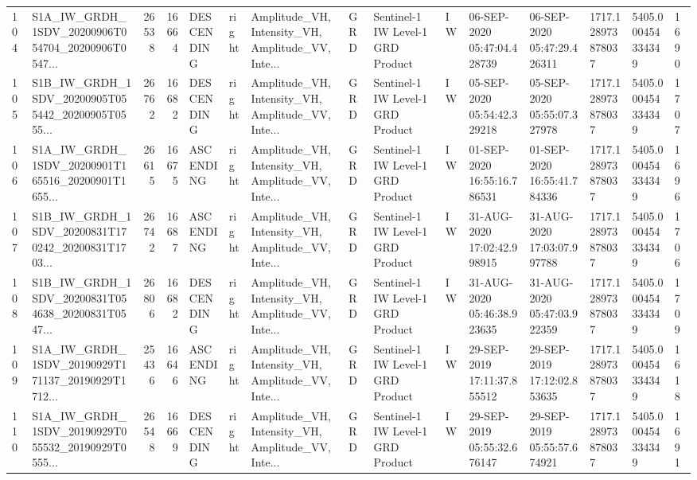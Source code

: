 \begin{tabular}{llrrlllllllllll}
104 &  S1A\_IW\_GRDH\_1SDV\_20200906T054704\_20200906T0547... &  26538 &   16664 &  DESCENDING &  right &  Amplitude\_VH, Intensity\_VH, Amplitude\_VV, Inte... &          GRD &  Sentinel-1 IW Level-1 GRD Product &              IW &  06-SEP-2020 05:47:04.428739 &  06-SEP-2020 05:47:29.426311 &          1717.128973878037 &  5405.000454334349 &       1690 \\
105 &  S1B\_IW\_GRDH\_1SDV\_20200905T055442\_20200905T0555... &  26762 &   16682 &  DESCENDING &  right &  Amplitude\_VH, Intensity\_VH, Amplitude\_VV, Inte... &          GRD &  Sentinel-1 IW Level-1 GRD Product &              IW &  05-SEP-2020 05:54:42.329218 &  05-SEP-2020 05:55:07.327978 &          1717.128973878037 &  5405.000454334349 &       1707 \\
106 &  S1A\_IW\_GRDH\_1SDV\_20200901T165516\_20200901T1655... &  26615 &   16675 &   ASCENDING &  right &  Amplitude\_VH, Intensity\_VH, Amplitude\_VV, Inte... &          GRD &  Sentinel-1 IW Level-1 GRD Product &              IW &  01-SEP-2020 16:55:16.786531 &  01-SEP-2020 16:55:41.784336 &          1717.128973878037 &  5405.000454334349 &       1696 \\
107 &  S1B\_IW\_GRDH\_1SDV\_20200831T170242\_20200831T1703... &  26742 &   16687 &   ASCENDING &  right &  Amplitude\_VH, Intensity\_VH, Amplitude\_VV, Inte... &          GRD &  Sentinel-1 IW Level-1 GRD Product &              IW &  31-AUG-2020 17:02:42.998915 &  31-AUG-2020 17:03:07.997788 &          1717.128973878037 &  5405.000454334349 &       1706 \\
108 &  S1B\_IW\_GRDH\_1SDV\_20200831T054638\_20200831T0547... &  26806 &   16682 &  DESCENDING &  right &  Amplitude\_VH, Intensity\_VH, Amplitude\_VV, Inte... &          GRD &  Sentinel-1 IW Level-1 GRD Product &              IW &  31-AUG-2020 05:46:38.923635 &  31-AUG-2020 05:47:03.922359 &          1717.128973878037 &  5405.000454334349 &       1709 \\
109 &  S1A\_IW\_GRDH\_1SDV\_20190929T171137\_20190929T1712... &  25436 &   16646 &   ASCENDING &  right &  Amplitude\_VH, Intensity\_VH, Amplitude\_VV, Inte... &          GRD &  Sentinel-1 IW Level-1 GRD Product &              IW &  29-SEP-2019 17:11:37.855512 &  29-SEP-2019 17:12:02.853635 &          1717.128973878037 &  5405.000454334349 &       1618 \\
110 &  S1A\_IW\_GRDH\_1SDV\_20190929T055532\_20190929T0555... &  26548 &   16669 &  DESCENDING &  right &  Amplitude\_VH, Intensity\_VH, Amplitude\_VV, Inte... &          GRD &  Sentinel-1 IW Level-1 GRD Product &              IW &  29-SEP-2019 05:55:32.676147 &  29-SEP-2019 05:55:57.674921 &          1717.128973878037 &  5405.000454334349 &       1691 \\

\end{tabular}
